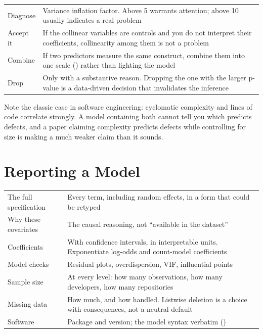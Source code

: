 \begin{center}
\small
\begin{tabular}{@{}L{3.6cm}L{10.7cm}@{}}
\toprule
Diagnose   & Variance inflation factor. Above 5 warrants attention; above 10
             usually indicates a real problem \\
Accept it  & If the collinear variables are controls and you do not interpret
             their coefficients, collinearity among them is not a problem \\
Combine    & If two predictors measure the same construct, combine them into
             one scale () rather than fighting the model \\
Drop       & Only with a substantive reason. Dropping the one with the larger
             p-value is a data-driven decision that invalidates the inference \\
\bottomrule
\end{tabular}
\end{center}

Note the classic case in software engineering: cyclomatic complexity and lines
of code correlate strongly. A model containing both cannot tell you which
predicts defects, and a paper claiming complexity predicts defects while
controlling for size is making a much weaker claim than it sounds.

\section{Reporting a Model}

\begin{center}
\small
\begin{tabular}{@{}L{4.0cm}L{10.3cm}@{}}
\toprule
The full specification & Every term, including random effects, in a form that
                         could be retyped \\
Why these covariates   & The causal reasoning, not ``available in the dataset'' \\
Coefficients           & With confidence intervals, in interpretable units.
                         Exponentiate log-odds and count-model coefficients \\
Model checks           & Residual plots, overdispersion, VIF, influential points \\
Sample size            & At every level: how many observations, how many
                         developers, how many repositories \\
Missing data           & How much, and how handled. Listwise deletion is a
                         choice with consequences, not a neutral default \\
Software               & Package and version; the model syntax verbatim
                         () \\
\bottomrule
\end{tabular}
\end{center}

